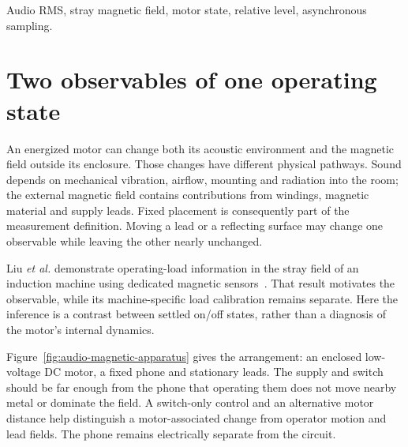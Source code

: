 \begin{abstract}
Sound and stray magnetic field provide different views of a motor's operating state. Their slow changes can be compared without assuming a common spectral response or precise sample synchronization. In the data, three on-minus-off comparisons give an energy-based relative audio-level change of 11.56~dB and a mean magnetic-magnitude change of $4.03\unit{\mu T}$. The calculation retains separate time axes, weights audio blocks by their actual sample counts, and distinguishes a vector-field change from a change in its norm. Signal amplitude, relative channel timing and the block-averaging intervals determine the timescale of these comparisons.
\end{abstract}
\begin{IEEEkeywords}
Audio RMS, stray magnetic field, motor state, relative level, asynchronous sampling.
\end{IEEEkeywords}

\section{Two observables of one operating state}
An energized motor can change both its acoustic environment and the magnetic field outside its enclosure. Those changes have different physical pathways. Sound depends on mechanical vibration, airflow, mounting and radiation into the room; the external magnetic field contains contributions from windings, magnetic material and supply leads. Fixed placement is consequently part of the measurement definition. Moving a lead or a reflecting surface may change one observable while leaving the other nearly unchanged.

Liu \emph{et al.} demonstrate operating-load information in the stray field of an induction machine using dedicated magnetic sensors~\cite{liu2017stray}. That result motivates the observable, while its machine-specific load calibration remains separate. Here the inference is a contrast between settled on/off states, rather than a diagnosis of the motor's internal dynamics.

Figure~\ref{fig:audio-magnetic-apparatus} gives the arrangement: an enclosed low-voltage DC motor, a fixed phone and stationary leads. The supply and switch should be far enough from the phone that operating them does not move nearby metal or dominate the field. A switch-only control and an alternative motor distance help distinguish a motor-associated change from operator motion and lead fields. The phone remains electrically separate from the circuit.

